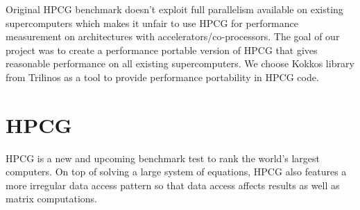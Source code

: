 \documentclass{ccr15}
\begin{document}
Original HPCG benchmark doesn't exploit full parallelism available on existing supercomputers which makes it unfair to use HPCG for performance measurement on architectures with accelerators/co-processors.
The goal of our project was to create a performance portable version of HPCG that gives reasonable performance on all existing supercomputers. 
We choose  Kokkos\cite{ZAB:Kokkos} library from Trilinos\cite{ZAB:Trilinos} as a tool to provide performance portability in HPCG code.


\section{HPCG}

HPCG is a new and
upcoming benchmark test to rank the world's largest computers. On top
of solving a large system of equations, HPCG also features a more irregular data access pattern
so that data access affects results as well as matrix computations.
\end{document}
